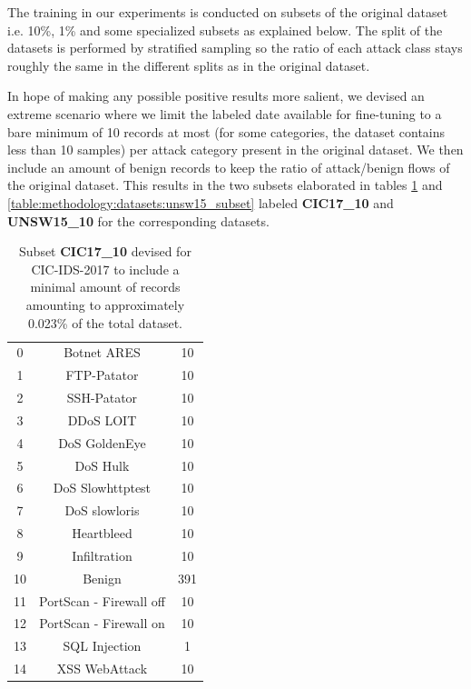 The training in our experiments is conducted on subsets of the original dataset i.e. 10\%, 1\% and some specialized subsets as explained below. The split of the datasets is performed by stratified sampling so the ratio of each attack class stays roughly the same in the different splits as in the original dataset.

In hope of making any possible positive results more salient, we devised an extreme scenario where we limit the labeled date available for fine-tuning to a bare minimum of 10 records at most (for some categories, the dataset contains less than 10 samples) per attack category present in the original dataset. We then include an amount of benign records to keep the ratio of attack/benign flows of the original dataset. This results in the two subsets elaborated in tables \ref{table:methodology:datasets:cic17_subset} and \ref{table:methodology:datasets:unsw15_subset} labeled \textbf{CIC17\_10} and \textbf{UNSW15\_10} for the corresponding datasets.

\begin{table}[H]
	\centering
	\begin{tabular}{ccc}
		\thead{\textbf{\#}} & \thead{\textbf{Class}} & \thead{\textbf{No. Records}} \\ \hline \midrule
		0  & Botnet ARES             & 10  \\
		1  & FTP-Patator             & 10  \\
		2  & SSH-Patator             & 10  \\
		3  & DDoS LOIT               & 10  \\
		4  & DoS GoldenEye           & 10  \\
		5  & DoS Hulk                & 10  \\
		6  & DoS Slowhttptest        & 10  \\
		7  & DoS slowloris           & 10  \\
		8  & Heartbleed              & 10  \\
		9  & Infiltration            & 10  \\
		10 & Benign                  & 391 \\
		11 & PortScan - Firewall off & 10  \\
		12 & PortScan - Firewall on  & 10  \\
		13 & SQL Injection           & 1   \\
		14 & XSS WebAttack           & 10                    
	\end{tabular}
	\caption{Subset \textbf{CIC17\_10} devised for CIC-IDS-2017 to include a minimal amount of records amounting to approximately 0.023\% of the total dataset.}
	\label{table:methodology:datasets:cic17_subset}
\end{table}

